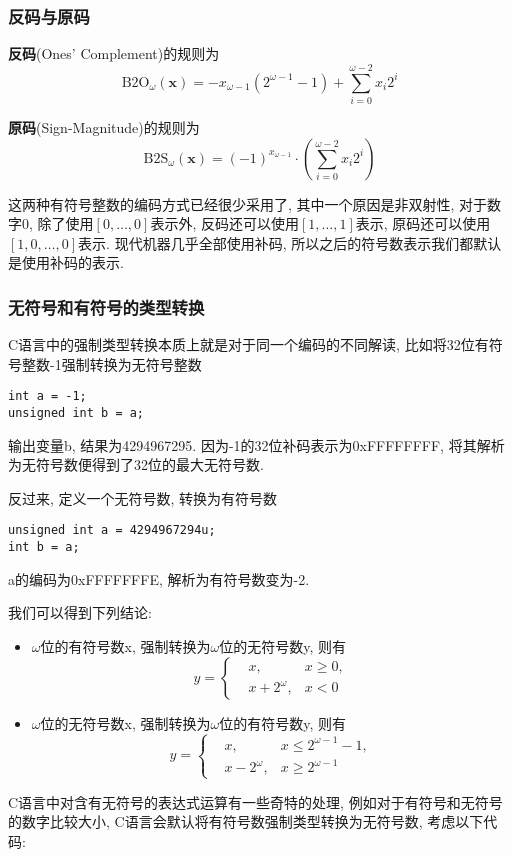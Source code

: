 \documentclass[utf8]{ctexart} %
\begin{document}
\subsubsection{反码与原码}
\textbf{反码}(Ones' Complement)的规则为$$\mathrm{B2O}_{\omega}(\boldsymbol{x})=-x_{\omega-1}(2^{\omega-1}-1)+\sum_{i=0}^{\omega-2}x_i2^i$$
\par
\textbf{原码}(Sign-Magnitude)的规则为$$\mathrm{B2S}_{\omega}(\boldsymbol{x})=(-1)^{x_{\omega-1}}\cdot(\sum_{i=0}^{\omega-2}x_i2^i)$$
\par 
这两种有符号整数的编码方式已经很少采用了, 其中一个原因是非双射性, 对于数字0, 除了使用$[0,\dots,0]$表示外, 反码还可以使用$[1,\dots,1]$表示, 原码还可以使用$[1,0,\dots,0]$表示. 现代机器几乎全部使用补码, 所以之后的符号数表示我们都默认是使用补码的表示.
\subsubsection{无符号和有符号的类型转换}
C语言中的强制类型转换本质上就是对于同一个编码的不同解读, 比如将32位有符号整数-1强制转换为无符号整数
\lstset{language=c++}
\begin{lstlisting}
int a = -1;
unsigned int b = a;
\end{lstlisting}
输出变量b, 结果为4294967295. 因为-1的32位补码表示为0xFFFFFFFF, 将其解析为无符号数便得到了32位的最大无符号数.\par 
反过来, 定义一个无符号数, 转换为有符号数
\lstset{language=c++}
\begin{lstlisting}
unsigned int a = 4294967294u;
int b = a;
\end{lstlisting}
a的编码为0xFFFFFFFE, 解析为有符号数变为-2.\par 
我们可以得到下列结论:
\begin{itemize}
	\item $\omega$位的有符号数x, 强制转换为$\omega$位的无符号数y, 则有
	$$y=\left\{
	\begin{aligned}
	&x, &x\geq0,\\
	&x+2^{\omega}, &x<0
	\end{aligned}
	\right.$$
	\item $\omega$位的无符号数x, 强制转换为$\omega$位的有符号数y, 则有
	$$y=\left\{
	\begin{aligned}
	&x, &x\leq2^{\omega-1}-1,\\
	&x-2^{\omega}, &x\geq2^{\omega-1}
	\end{aligned}
	\right.$$
\end{itemize}
C语言中对含有无符号的表达式运算有一些奇特的处理, 例如对于有符号和无符号的数字比较大小, C语言会默认将有符号数强制类型转换为无符号数, 考虑以下代码:
\end{document}
